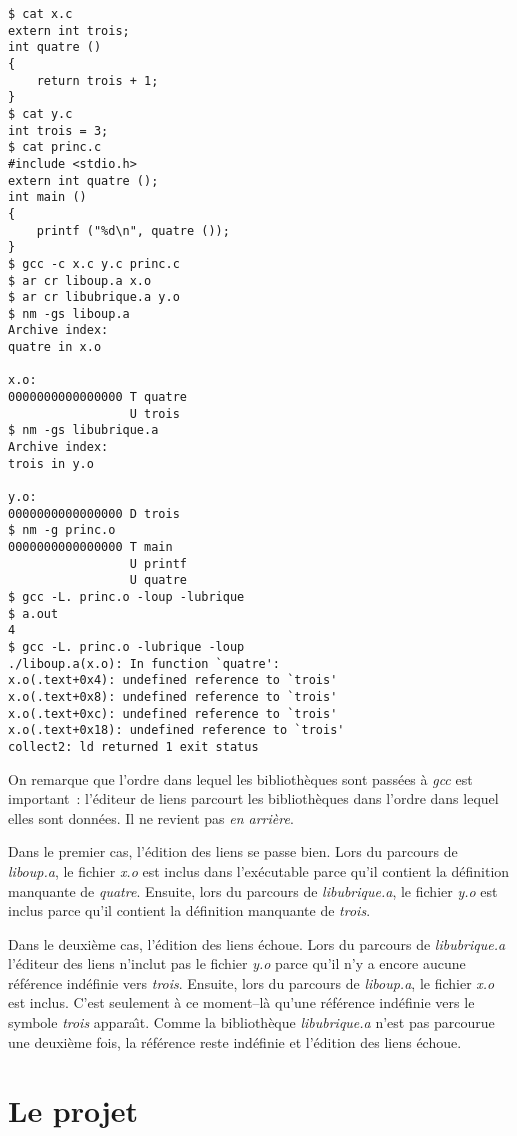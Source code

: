\documentclass{article}
\begin{document}
\begin{verbatim}
$ cat x.c
extern int trois;
int quatre ()
{
    return trois + 1;
}
$ cat y.c
int trois = 3;
$ cat princ.c
#include <stdio.h>
extern int quatre ();
int main ()
{
    printf ("%d\n", quatre ());
}
$ gcc -c x.c y.c princ.c
$ ar cr liboup.a x.o
$ ar cr libubrique.a y.o
$ nm -gs liboup.a
Archive index:
quatre in x.o
 
x.o:
0000000000000000 T quatre
                 U trois
$ nm -gs libubrique.a
Archive index:
trois in y.o
 
y.o:
0000000000000000 D trois
$ nm -g princ.o
0000000000000000 T main
                 U printf
                 U quatre
$ gcc -L. princ.o -loup -lubrique
$ a.out
4
$ gcc -L. princ.o -lubrique -loup
./liboup.a(x.o): In function `quatre':
x.o(.text+0x4): undefined reference to `trois'
x.o(.text+0x8): undefined reference to `trois'
x.o(.text+0xc): undefined reference to `trois'
x.o(.text+0x18): undefined reference to `trois'
collect2: ld returned 1 exit status
\end{verbatim}

On remarque que l'ordre dans lequel les biblioth{\`e}ques sont pass{\'e}es {\`a} {\em gcc}
est important~: l'{\'e}diteur de liens parcourt les biblioth{\`e}ques dans l'ordre 
dans lequel elles sont donn{\'e}es. Il ne revient pas \emph{en arri{\`e}re}.

Dans le premier cas, l'{\'e}dition des liens se passe bien.
Lors du parcours de {\em liboup.a}, le fichier {\em x.o} est inclus dans 
l'ex{\'e}cutable parce qu'il contient la d{\'e}finition manquante de {\em quatre}.
Ensuite, lors du parcours de {\em libubrique.a}, le fichier {\em y.o} est
inclus parce qu'il contient la d{\'e}finition manquante de {\em trois}.

Dans le deuxi{\`e}me cas, l'{\'e}dition des liens {\'e}choue.
Lors du parcours de {\em libubrique.a} l'{\'e}diteur des liens n'inclut pas
le fichier {\em y.o} parce qu'il n'y a encore aucune r{\'e}f{\'e}rence ind{\'e}finie
vers {\em trois}. Ensuite, lors du parcours de {\em liboup.a}, le
fichier {\em x.o} est inclus. C'est seulement {\`a} ce moment--l{\`a} qu'une r{\'e}f{\'e}rence
ind{\'e}finie vers le symbole {\em trois} appara{\^\i}t. Comme la biblioth{\`e}que
{\em libubrique.a} n'est pas parcourue une deuxi{\`e}me fois, la r{\'e}f{\'e}rence
reste ind{\'e}finie et l'{\'e}dition des liens {\'e}choue.

\section{Le projet}
\end{document}
